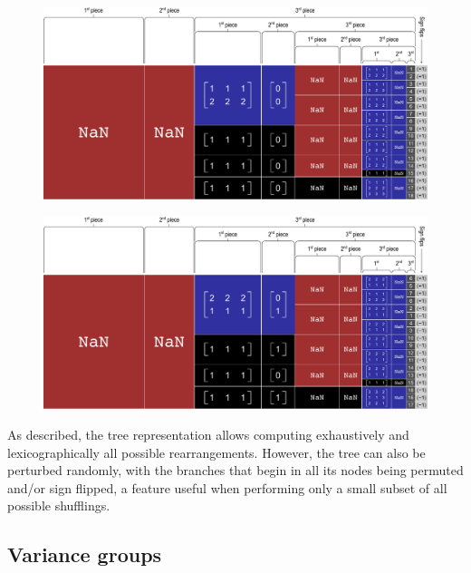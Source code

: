\begin{figure}[!p]
\centering
\includegraphics[angle=90,origin=c,scale=.8]{figures/impltree_default.pdf}
\label{fig:impltree_default_noref}
\end{figure}

\begin{figure}[!p]
\centering
\includegraphics[angle=90,origin=c,scale=.8]{figures/impltree_shuffled.pdf}
\label{fig:impltree_shuffled_noref}
\end{figure}

As described, the tree representation allows computing exhaustively and lexicographically all possible rearrangements. However, the tree can also be perturbed randomly, with the branches that begin in all its nodes being permuted and/or sign flipped, a feature useful when performing only a small subset of all possible shufflings.

\subsection{Variance groups}

